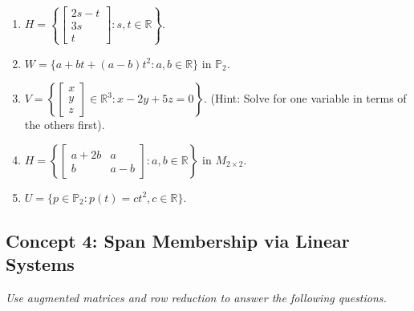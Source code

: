 \documentclass[11pt]{article}
\begin{document}
\begin{enumerate}[resume]
    \item $H = \left\{ \begin{bmatrix} 2s - t \\ 3s \\ t \end{bmatrix} : s, t \in \mathbb{R} \right\}$.
    \item $W = \{ a + bt + (a-b)t^2 : a, b \in \mathbb{R} \}$ in $\mathbb{P}_2$.
    \item $V = \left\{ \begin{bmatrix} x \\ y \\ z \end{bmatrix} \in \mathbb{R}^3 : x - 2y + 5z = 0 \right\}$. (Hint: Solve for one variable in terms of the others first).
    \item $H = \left\{ \begin{bmatrix} a+2b & a \\ b & a-b \end{bmatrix} : a, b \in \mathbb{R} \right\}$ in $M_{2\times 2}$.
    \item $U = \{ p \in \mathbb{P}_2 : p(t) = ct^2, c \in \mathbb{R} \}$.
\end{enumerate}

\subsection*{Concept 4: Span Membership via Linear Systems}
\textit{Use augmented matrices and row reduction to answer the following questions.}
\end{document}
